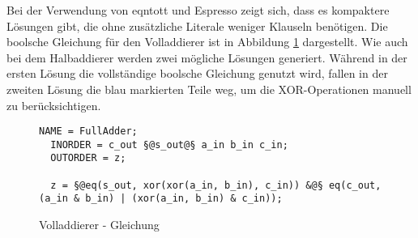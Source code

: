 Bei der Verwendung von eqntott und Espresso zeigt sich, dass es kompaktere Lösungen gibt, die ohne zusätzliche Literale weniger Klauseln benötigen.
Die boolsche Gleichung für den Volladdierer ist in Abbildung \ref{fig:fulladder_qen} dargestellt. Wie auch bei dem Halbaddierer werden zwei mögliche
Lösungen generiert. Während in der ersten Lösung die vollständige boolsche Gleichung genutzt wird, fallen in der zweiten Lösung die blau markierten
Teile weg, um die XOR-Operationen manuell zu berücksichtigen.
\begin{figure}[!h]
  \centering
  \begin{lstlisting}[]
  NAME = FullAdder;
  INORDER = c_out §@s_out@§ a_in b_in c_in;
  OUTORDER = z;

  z = §@eq(s_out, xor(xor(a_in, b_in), c_in)) &@§ eq(c_out, (a_in & b_in) | (xor(a_in, b_in) & c_in));
  \end{lstlisting}
  \caption{Volladdierer - Gleichung}
  \label{fig:fulladder_qen}
\end{figure}

